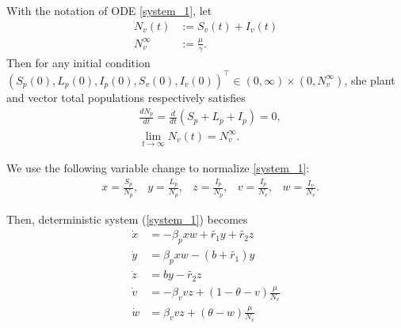 
\begin{theorem}\label{theorem_1}
	With the notation of ODE \eqref{system_1}, let
	\begin{equation*}
		\begin{aligned}
			N_v(t) &:= S_v(t) + I_v(t) 
		 	\\
		 	N_v^{\infty} &:= \frac{\mu}{\gamma}.
		 \end{aligned}
	\end{equation*}
	Then for any initial condition 
	$
		(S_p(0), L_p(0), I_p(0), S_v(0), I_v(0) )^\top
	 	\in {(0,\infty) \times (0, N^\infty_v)}
	$, she plant and vector total populations respectively satisfies
	\begin{equation*}
		\begin{aligned}
			& \frac{d N_p}{dt} =
				\frac{d}{dt}(S_p + L_p + I_p) = 0,
			\\
			& \lim_{t\to \infty}
				N_v(t) = N_v^{\infty}.
		\end{aligned}
	\end{equation*}
\end{theorem}

We use the following variable change to normalize  \eqref{system_1}:
\begin{equation}
	\label{eqn:normalization}
	\begin{aligned}
		& x = \frac{S_p}{N_p},
		& y = \frac{L_p}{N_p},
		& z = \frac{I_p}{N_p},
		& v = \frac{I_p}{N_v},
		& w = \frac{I_v}{N_v} .
	\end{aligned}
\end{equation}

Then, deterministic system (\ref{system_1}) becomes
\begin{equation}
	\begin{aligned}
		\label{system_2}
		\dot{x} &=
			-\beta_p x w + \tilde{r_1} y + \tilde{r_2} z 
		\\
		\dot{y} &=
			\beta_p x w - (b + \tilde{r_1}) y 
		\\
		\dot{z} &=
			b y - \tilde{r_2} z 
		\\
		\dot{v} &=
			-\beta_v v z  +(1-\theta-v)\frac{\mu}{N_v} 
		\\
		\dot{w} &=
			\beta_v v z + (\theta-w) \frac{\mu}{N_v}
		\end{aligned}
\end{equation}


